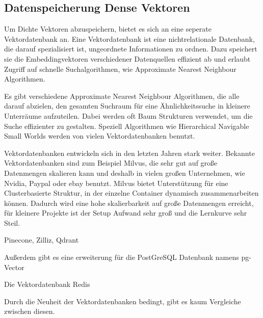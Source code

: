 \subsection{Datenspeicherung Dense Vektoren}

Um Dichte Vektoren abzuspeichern, bietet es sich an eine seperate Vektordatenbank an.
Eine Vektordatenbank ist eine nichtrelationale Datenbank, die darauf spezialisiert ist, ungeordnete Informationen zu ordnen.
Dazu speichert sie die Embeddingvektoren verschiedener Datenquellen effizient ab und erlaubt Zugriff auf schnelle Suchalgorithmen, wie Approximate Nearest Neighbour Algorithmen.

Es gibt verschiedene Approximate Nearest Neighbour Algorithmen, die alle darauf abzielen, den gesamten Suchraum für eine Ähnlichkeitssuche in kleinere Unterräume aufzuteilen.
Dabei werden oft Baum Strukturen verwendet, um die Suche effizienter zu gestalten.
Speziell Algorithmen wie Hierarchical Navigable Small Worlds werden von vielen Vektordatenbanken benutzt.

Vektordatenbanken entwickeln sich in den letzten Jahren stark weiter.
Bekannte Vektordatenbanken sind zum Beispiel Milvus, die sehr gut auf große Datenmengen skalieren kann und deshalb in vielen großen Unternehmen, wie Nvidia, Paypal oder ebay benutzt.
Milvus bietet Unterstützung für eine Clusterbasierte Struktur, in der einzelne Container dynamisch zusammenarbeiten können.
Dadurch wird eine hohe skalierbarkeit auf große Datenmengen erreicht, für kleinere Projekte ist der Setup Aufwand sehr groß und die Lernkurve sehr Steil.

Pinecone, Zilliz, Qdrant

Außerdem gibt es eine erweiterung für die PostGreSQL Datenbank namens pg-Vector

Die Vektordatenbank Redis

Durch die Neuheit der Vektordatenbanken bedingt, gibt es kaum Vergleiche zwischen diesen.
\cite{blueteamai}



